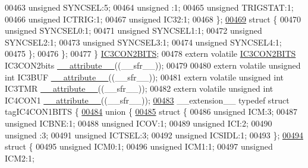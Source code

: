 \begin{DoxyCode}
00463       \textcolor{keywordtype}{unsigned} SYNCSEL:5;
00464       \textcolor{keywordtype}{unsigned} :1;
00465       \textcolor{keywordtype}{unsigned} TRIGSTAT:1;
00466       \textcolor{keywordtype}{unsigned} ICTRIG:1;
00467       \textcolor{keywordtype}{unsigned} IC32:1;
00468     \};
\hypertarget{a00015_source_l00469}{}\hyperlink{a00015}{00469}     \textcolor{keyword}{struct }\{
00470       \textcolor{keywordtype}{unsigned} SYNCSEL0:1;
00471       \textcolor{keywordtype}{unsigned} SYNCSEL1:1;
00472       \textcolor{keywordtype}{unsigned} SYNCSEL2:1;
00473       \textcolor{keywordtype}{unsigned} SYNCSEL3:1;
00474       \textcolor{keywordtype}{unsigned} SYNCSEL4:1;
00475     \};
00476   \};
00477 \} \hyperlink{a00014_d9/d34/a00476}{IC3CON2BITS};
00478 \textcolor{keyword}{extern} \textcolor{keyword}{volatile} \hyperlink{a00014_d9/d34/a00476}{IC3CON2BITS} IC3CON2bits \hyperlink{a00015_a493c46f03454991ccc5aa7a6e1dfb2a7}{\_\_attribute\_\_}((\_\_sfr\_\_));
00479 
00480 \textcolor{keyword}{extern} \textcolor{keyword}{volatile} \textcolor{keywordtype}{unsigned} \textcolor{keywordtype}{int}  IC3BUF \hyperlink{a00015_a493c46f03454991ccc5aa7a6e1dfb2a7}{\_\_attribute\_\_}((\_\_sfr\_\_));
00481 \textcolor{keyword}{extern} \textcolor{keyword}{volatile} \textcolor{keywordtype}{unsigned} \textcolor{keywordtype}{int}  IC3TMR \hyperlink{a00015_a493c46f03454991ccc5aa7a6e1dfb2a7}{\_\_attribute\_\_}((\_\_sfr\_\_));
00482 \textcolor{keyword}{extern} \textcolor{keyword}{volatile} \textcolor{keywordtype}{unsigned} \textcolor{keywordtype}{int}  IC4CON1 \hyperlink{a00015_a493c46f03454991ccc5aa7a6e1dfb2a7}{\_\_attribute\_\_}((\_\_sfr\_\_));
\hypertarget{a00015_source_l00483}{}\hyperlink{a00014}{00483} \_\_extension\_\_ \textcolor{keyword}{typedef} \textcolor{keyword}{struct }tagIC4CON1BITS \{
\hypertarget{a00015_source_l00484}{}\hyperlink{a00015}{00484}   \textcolor{keyword}{union }\{
\hypertarget{a00015_source_l00485}{}\hyperlink{a00015}{00485}     \textcolor{keyword}{struct }\{
00486       \textcolor{keywordtype}{unsigned} ICM:3;
00487       \textcolor{keywordtype}{unsigned} ICBNE:1;
00488       \textcolor{keywordtype}{unsigned} ICOV:1;
00489       \textcolor{keywordtype}{unsigned} ICI:2;
00490       \textcolor{keywordtype}{unsigned} :3;
00491       \textcolor{keywordtype}{unsigned} ICTSEL:3;
00492       \textcolor{keywordtype}{unsigned} ICSIDL:1;
00493     \};
\hypertarget{a00015_source_l00494}{}\hyperlink{a00015}{00494}     \textcolor{keyword}{struct }\{
00495       \textcolor{keywordtype}{unsigned} ICM0:1;
00496       \textcolor{keywordtype}{unsigned} ICM1:1;
00497       \textcolor{keywordtype}{unsigned} ICM2:1;

\end{DoxyCode}
